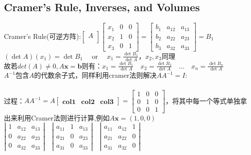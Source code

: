 \documentclass[UTF8]{article}
\begin{document}
    \subsection{Cramer's Rule, Inverses, and Volumes}
    Cramer's Rule(可逆方阵):$\left[\begin{array}{l}{A} \\ {}\end{array}\right]\left[\begin{array}{lll}{x_{1}} & {0} & {0} \\ {x_{2}} & {1} & {0} \\ {x_{3}} & {0} & {1}\end{array}\right]=\left[\begin{array}{lll}{b_{1}} & {a_{12}} & {a_{13}} \\ {b_{2}} & {a_{22}} & {a_{23}} \\ {b_{3}} & {a_{32}} & {a_{33}}\end{array}\right]=B_{1}$
    \\
    $(\operatorname{det} A)\left(x_{1}\right)=\operatorname{det} B_{1} \quad$ or $\quad x_{1}=\frac{\operatorname{det} B_{1}}{\operatorname{det} A}$，$x_2,x_3$同理\\
    故若$det(A)\neq 0, A \bm{x}=\bm{b}$则有：$x_{1}=\frac{\operatorname{det} B_{1}}{\operatorname{det} A} \quad x_{2}=\frac{\operatorname{det} B_{2}}{\operatorname{det} A} \quad \ldots \quad x_{n}=\frac{\operatorname{det} B_{n}}{\operatorname{det} A}$
    \\
    $A^{-1}$包含$A$的代数余子式，同样利用cramer法则解决$AA^{-1}=I$:\\
    \\
    过程：$AA^{-1}=A\left[\begin{array}{lll} \bm{col1} & \bm{col2} & \bm{col3} \end{array}\right] = \left[\begin{array}{lll}
    1 & 0 & 0 \\0 & 1 & 0 \\0 & 0 & 1
    \end{array}\right]$，将其中每一个等式单独拿出来利用Cramer法则进行计算,例如$A \boldsymbol{x}=(1,0,0)$\\
    $\left|\begin{array}{lll}{1} & {a_{12}} & {a_{13}} \\ {0} & {a_{22}} & {a_{23}} \\ {0} & {a_{32}} & {a_{33}}\end{array}\right| \quad\left|\begin{array}{lll}{a_{11}} & {1} & {a_{13}} \\ {a_{21}} & {0} & {a_{23}} \\ {a_{31}} & {0} & {a_{33}}\end{array}\right| \quad\left|\begin{array}{lll}{a_{11}} & {a_{12}} & {1} \\ {a_{21}} & {a_{22}} & {0} \\ {a_{31}} & {a_{32}} & {0}\end{array}\right|$
\end{document}
